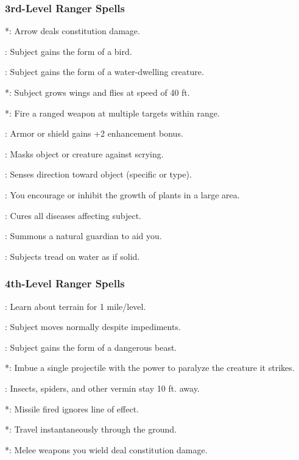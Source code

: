 \subsubsection{3rd-Level Ranger Spells}
\begin{list}{}{\leftmargin=1em}
\item {}*: Arrow deals constitution damage.
\item {}: Subject gains the form of a bird.
\item {}: Subject gains the form of a water-dwelling creature.
\item {}*: Subject grows wings and flies at speed of 40 ft.
\item {}*: Fire a ranged weapon at multiple targets within range.
\item {}: Armor or shield gains +2 enhancement bonus.
\item {}: Masks object or creature against scrying.
\item {}: Senses direction toward object (specific or type).
\item {}: You encourage or inhibit the growth of plants in a large area.
\item {}: Cures all diseases affecting subject.
\item {}: Summons a natural guardian to aid you.
\item {}: Subjects tread on water as if solid.
\end{list}
\subsubsection{4th-Level Ranger Spells}
\begin{list}{}{\leftmargin=1em}
\item {}: Learn about terrain for 1 mile/level.
\item {}: Subject moves normally despite impediments.
\item {}: Subject gains the form of a dangerous beast.
\item {}*: Imbue a single projectile with the power to paralyze the creature it strikes.
\item {}: Insects, spiders, and other vermin stay 10 ft. away.
\item {}*: Missile fired ignores line of effect.
\item {}*: Travel instantaneously through the ground.
\item {}*: Melee weapons you wield deal constitution damage.
\end{list}
